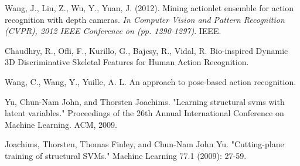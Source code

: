 \documentclass[10pt,letterpaper]{article}
\newcommand{\+}[1]{\ensuremath{{\boldsymbol #1}}}
\begin{document}
\begin{thebibliography}{1}

 Wang, J., Liu, Z., Wu, Y., Yuan, J. (2012). Mining actionlet ensemble for action recognition with depth cameras. \emph{In Computer Vision and Pattern Recognition (CVPR), 2012 IEEE Conference on (pp. 1290-1297)}. IEEE.

 Chaudhry, R., Ofli, F., Kurillo, G., Bajcsy, R., Vidal, R. Bio-inspired Dynamic 3D Discriminative Skeletal Features for Human Action Recognition.

 Wang, C., Wang, Y., Yuille, A. L. An approach to pose-based action recognition.

 Yu, Chun-Nam John, and Thorsten Joachims. "Learning structural svms with latent variables." Proceedings of the 26th Annual International Conference on Machine Learning. ACM, 2009.

 Joachims, Thorsten, Thomas Finley, and Chun-Nam John Yu. "Cutting-plane training of structural SVMs." Machine Learning 77.1 (2009): 27-59.

\end{thebibliography}
\end{document}
